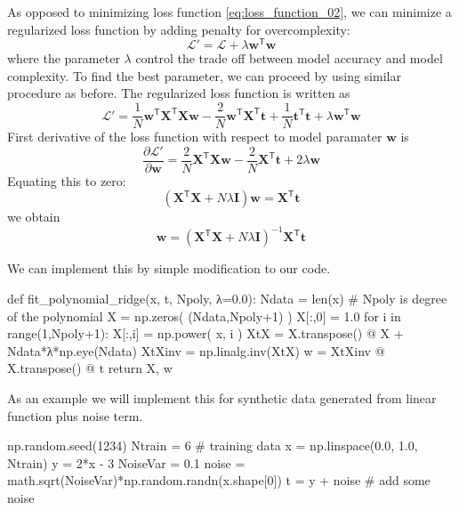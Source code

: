 As opposed to minimizing loss function \eqref{eq:loss_function_02}, we can minimize
a regularized loss function by adding penalty for overcomplexity:
\begin{equation*}
\mathcal{L}' = \mathcal{L} + \lambda \mathbf{w}^{\mathsf{T}} \mathbf{w}
\end{equation*}
where the parameter $\lambda$ control the trade off between model accuracy and
model complexity.
To find the best parameter, we can proceed by using similar procedure as before.
The regularized loss function is written as
\begin{equation}
\mathcal{L}' = \frac{1}{N} \mathbf{w}^{\mathsf{T}} \mathbf{X}^{\mathsf{T}} \mathbf{X} \mathbf{w}
- \frac{2}{N} \mathbf{w}^{\mathsf{T}} \mathbf{X}^{\mathsf{T}} \mathbf{t}
+ \frac{1}{N} \mathbf{t}^{\mathsf{T}} \mathbf{t}
+ \lambda \mathbf{w}^{\mathsf{T}} \mathbf{w}
\end{equation}
First derivative of the loss function with respect to model paramater $\mathbf{w}$ is
\begin{equation*}
\frac{\partial \mathcal{L}'}{\partial \mathbf{w}} =
\frac{2}{N} \mathbf{X}^{\mathsf{T}} \mathbf{X} \mathbf{w}
- \frac{2}{N} \mathbf{X}^{\mathsf{T}} \mathbf{t} + 2\lambda\mathbf{w}
\end{equation*}
Equating this to zero:
\begin{equation*}
( \mathbf{X}^{\mathsf{T}} \mathbf{X} + N \lambda \mathbf{I} ) \mathbf{w} = \mathbf{X}^{\mathsf{T}} \mathbf{t}
\end{equation*}
we obtain
\begin{equation}
\mathbf{w} =
( \mathbf{X}^{\mathsf{T}} \mathbf{X} + N \lambda \mathbf{I} )^{-1}
\mathbf{X}^{\mathsf{T}} \mathbf{t}
\end{equation}

We can implement this by simple modification to our code.
\begin{pythoncode}
def fit_polynomial_ridge(x, t, Npoly, λ=0.0):
    Ndata = len(x)
    # Npoly is degree of the polynomial
    X = np.zeros( (Ndata,Npoly+1) )
    X[:,0] = 1.0
    for i in range(1,Npoly+1):
        X[:,i] = np.power( x, i )
    XtX = X.transpose() @ X + Ndata*λ*np.eye(Ndata)
    XtXinv = np.linalg.inv(XtX)
    w = XtXinv @ X.transpose() @ t
    return X, w
\end{pythoncode}

As an example we will implement this for synthetic data generated from linear
function plus noise term.
\begin{juliacode}
np.random.seed(1234)
Ntrain = 6 # training data
x = np.linspace(0.0, 1.0, Ntrain)
y = 2*x - 3
NoiseVar = 0.1
noise = math.sqrt(NoiseVar)*np.random.randn(x.shape[0])
t = y + noise # add some noise
\end{juliacode}


